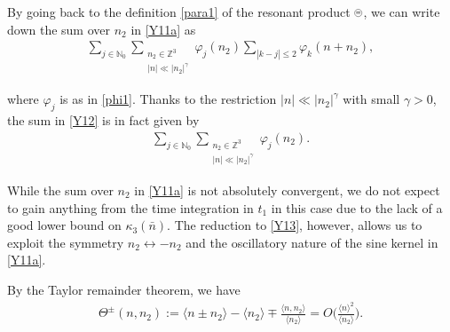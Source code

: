 \documentclass[%
11pt,  reqno]{amsart}
\newcommand{\pe}{\mathbin{\scaleobj{0.7}{\tikz \draw (0,0) node[shape=circle,draw,inner sep=0pt,minimum size=8.5pt] {\scriptsize  $=$};}}}
\newcommand{\1}{\hspace{0.2mm}\text{I}\hspace{0.2mm}}
\newcommand{\noi}{\noindent}
\newcommand{\Z}{\mathbb{Z}}
\newcommand{\kk}{\kappa}
\newcommand{\g}{\gamma}
\newcommand{\jb}[1]
{\langle #1 \rangle}
\newcommand{\N}{\mathbb{N}}
\numberwithin{equation}{section}
\numberwithin{theorem}{section}
\begin{document}
\noi
By going back to the definition \eqref{para1}
of the resonant product $\pe$, 
we can write down the  sum over $n_2$ in \eqref{Y11a} 
as 
\begin{align}
\sum_{j \in \N_0}
\sum_{\substack{n_2 \in \Z^3\\|n| \ll |n_2|^\g}}\varphi_j(n_2)
\sum_{|k - j|\leq 2}\varphi_k(n + n_2), 
\label{Y12}
\end{align}

\noi
where $\varphi_j$ is as in \eqref{phi1}.
Thanks to the restriction $|n| \ll |n_2|^\g$ with small $\g > 0$, 
the sum in \eqref{Y12} is in fact given by 
\begin{align}
\sum_{j \in \N_0}
\sum_{\substack{n_2 \in \Z^3\\|n| \ll |n_2|^\g}}\varphi_j(n_2).
\label{Y13}
\end{align}



\noi
While the sum over $n_2$ in \eqref{Y11a} is not absolutely convergent, 
we do not expect to gain anything from the time integration in $t_1$
in this case
due to the lack of a good lower bound on $\kk_3(\bar n)$.
The reduction to \eqref{Y13}, however, 
allows us to exploit 
the symmetry $n_2 \leftrightarrow -n_2$
and the oscillatory nature of the sine kernel in \eqref{Y11a}.


By the Taylor remainder theorem, we have
\begin{align}
\Theta^\pm(n, n_2)
:=  \jb{n \pm n_2 }- \jb{n_2}
 \mp \frac{\jb{n, n_2}}{\jb{n_2}}
 = O\bigg(\frac{\jb{n}^2}{\jb{n_2}}\bigg).
\label{Y14}
\end{align}
\end{document}
